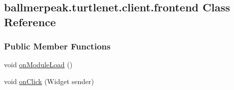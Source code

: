 \hypertarget{classballmerpeak_1_1turtlenet_1_1client_1_1frontend}{\subsection{ballmerpeak.\-turtlenet.\-client.\-frontend Class Reference}
\label{classballmerpeak_1_1turtlenet_1_1client_1_1frontend}
}
\subsubsection*{Public Member Functions}
\begin{DoxyCompactItemize}
\item 
void \hyperlink{classballmerpeak_1_1turtlenet_1_1client_1_1frontend_adce2a675f44267e0ab469bcb30095a39}{on\-Module\-Load} ()
\item 
void \hyperlink{classballmerpeak_1_1turtlenet_1_1client_1_1frontend_a32d8529c726125bae2ac35635712d067}{on\-Click} (Widget sender)
\end{DoxyCompactItemize}
